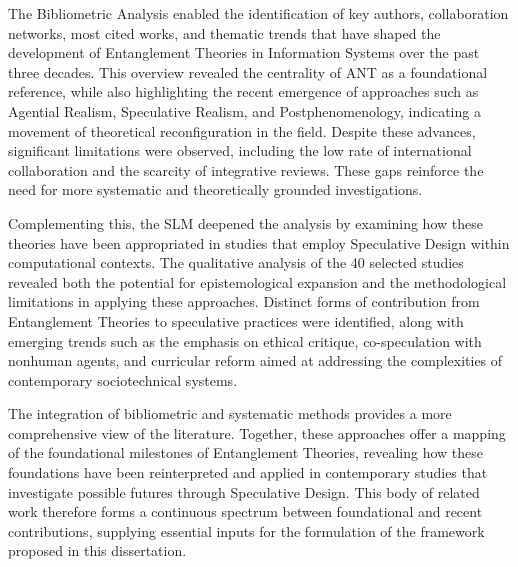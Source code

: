 The Bibliometric Analysis enabled the identification of key authors, collaboration networks, most cited works, and thematic trends that have shaped the development of Entanglement Theories in Information Systems over the past three decades. This overview revealed the centrality of ANT as a foundational reference, while also highlighting the recent emergence of approaches such as Agential Realism, Speculative Realism, and Postphenomenology, indicating a movement of theoretical reconfiguration in the field. Despite these advances, significant limitations were observed, including the low rate of international collaboration and the scarcity of integrative reviews. These gaps reinforce the need for more systematic and theoretically grounded investigations.

Complementing this, the SLM deepened the analysis by examining how these theories have been appropriated in studies that employ Speculative Design within computational contexts. The qualitative analysis of the 40 selected studies revealed both the potential for epistemological expansion and the methodological limitations in applying these approaches. Distinct forms of contribution from Entanglement Theories to speculative practices were identified, along with emerging trends such as the emphasis on ethical critique, co-speculation with nonhuman agents, and curricular reform aimed at addressing the complexities of contemporary sociotechnical systems.

The integration of bibliometric and systematic methods provides a more comprehensive view of the literature. Together, these approaches offer a mapping of the foundational milestones of Entanglement Theories, revealing how these foundations have been reinterpreted and applied in contemporary studies that investigate possible futures through Speculative Design. This body of related work therefore forms a continuous spectrum between foundational and recent contributions, supplying essential inputs for the formulation of the framework proposed in this dissertation.
